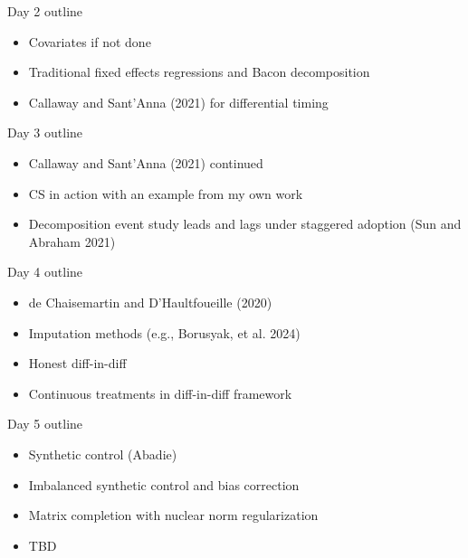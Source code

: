 \documentclass{beamer}
\begin{document}
\begin{frame}{Day 2 outline}

	\begin{itemize}
	\item Covariates if not done
	\item Traditional fixed effects regressions and Bacon decomposition
	\item Callaway and Sant'Anna (2021) for differential timing
	\end{itemize}

\end{frame}


\begin{frame}{Day 3 outline}


\begin{itemize}
\item Callaway and Sant'Anna (2021) continued
\item CS in action with an example from my own work
\item Decomposition event study leads and lags under staggered adoption (Sun and Abraham 2021)
\end{itemize}

\end{frame}

\begin{frame}{Day 4 outline}

\begin{itemize}

\item de Chaisemartin and D'Haultfoueille (2020)
\item Imputation methods (e.g., Borusyak, et al. 2024)
\item Honest diff-in-diff
\item Continuous treatments in diff-in-diff framework 

\end{itemize}

\end{frame}

\begin{frame}{Day 5 outline}

\begin{itemize}

\item Synthetic control (Abadie)
\item Imbalanced synthetic control and bias correction
\item Matrix completion with nuclear norm regularization
\item TBD

\end{itemize}

\end{frame}
\end{document}
